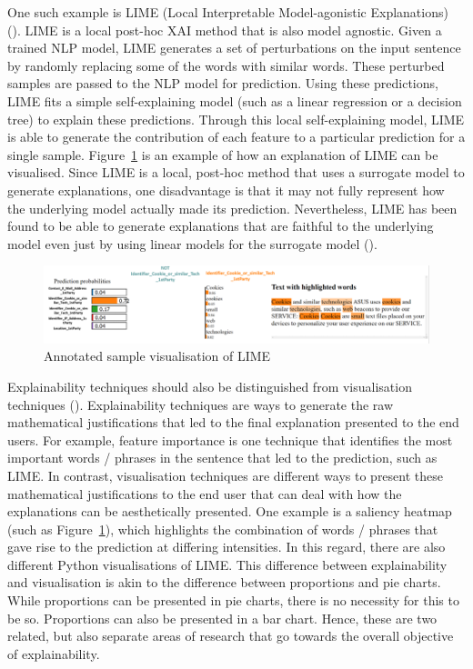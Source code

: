 One such example is LIME (Local Interpretable Model-agonistic Explanations) (\cite{lime}). LIME is a local post-hoc XAI method that is also model agnostic. Given a trained NLP model, LIME generates a set of perturbations on the input sentence by randomly replacing some of the words with similar words. These perturbed samples are passed to the NLP model for prediction. Using these predictions, LIME fits a simple self-explaining model (such as a linear regression or a decision tree) to explain these predictions. Through this local self-explaining model, LIME is able to generate the contribution of each feature to a particular prediction for a single sample. Figure~\ref{fig:lime_sample} is an example of how an explanation of LIME can be visualised. Since LIME is a local, post-hoc method that uses a surrogate model to generate explanations, one disadvantage is that it may not fully represent how the underlying model actually made its prediction. Nevertheless, LIME has been found to be able to generate explanations that are faithful to the underlying model even just by using linear models for the surrogate model (\cite{lime}).

\begin{figure}[!ht]
	\centering
	\includegraphics[width=1\linewidth]{figures/explanations_visualisations/section_4a/Picture1.png}
	\caption{Annotated sample visualisation of LIME}   
    \label{fig:lime_sample}
\end{figure}

Explainability techniques should also be distinguished from visualisation techniques (\cite{danilevsky2020}). Explainability techniques are ways to generate the raw mathematical justifications that led to the final explanation presented to the end users. For example, feature importance is one technique that identifies the most important words / phrases in the sentence that led to the prediction, such as LIME. In contrast, visualisation techniques are different ways to present these mathematical justifications to the end user that can deal with how the explanations can be aesthetically presented. One example is a saliency heatmap (such as Figure~\ref{fig:lime_sample}), which highlights the combination of words / phrases that gave rise to the prediction at differing intensities. In this regard, there are also different Python visualisations of LIME. This difference between explainability and visualisation is akin to the difference between proportions and pie charts. While proportions can be presented in pie charts, there is no necessity for this to be so. Proportions can also be presented in a bar chart. Hence, these are two related, but also separate areas of research that go towards the overall objective of explainability.

